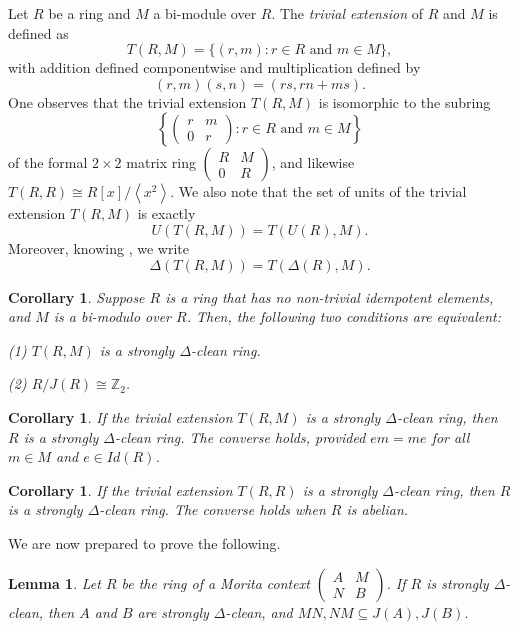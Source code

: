 \documentclass[12pt]{amsart}
\newtheorem{lemma}[theorem]{Lemma}
\newtheorem{corollary}[theorem]{Corollary}
\theoremstyle{definition}
\begin{document}
Let $R$ be a ring and $M$ a bi-module over $R$. The {\it trivial extension} of $R$ and $M$ is defined as
\[ T(R, M) = \{(r, m) : r \in R \text{ and } m \in M\}, \]
with addition defined componentwise and multiplication defined by
\[ (r, m)(s, n) = (rs, rn + ms). \]
One observes that the trivial extension $T(R, M)$ is isomorphic to the subring
\[ \left\{ \begin{pmatrix} r & m \\ 0 & r \end{pmatrix} : r \in R \text{ and } m \in M \right\} \]
of the formal $2 \times 2$ matrix ring $\begin{pmatrix} R & M \\ 0 & R \end{pmatrix}$, and likewise $T(R, R) \cong R[x]/\left\langle x^2 \right\rangle$. We also note that the set of units of the trivial extension $T(R, M)$ is exactly \[ U(T(R, M)) = T(U(R), M). \]
Moreover, knowing \cite {kkqt}, we write
\[ \Delta(T(R, M)) = T(\Delta(R), M). \]

\begin{corollary}
Suppose $R$ is a ring that has no non-trivial idempotent elements, and $M$ is a bi-modulo over $R$. Then, the following two conditions are equivalent:

(1) $T(R, M)$ is a strongly $\Delta$-clean ring.

(2) \( R/J(R) \cong \mathbb{Z}_2 \).
\end{corollary}

\begin{corollary}
If the trivial extension $T(R,M)$ is a strongly $\Delta$-clean ring, then $R$ is a strongly $\Delta$-clean ring. The converse holds, provided $em=me$ for all $m\in M$ and $e\in Id(R)$.
\end{corollary}

\begin{corollary}
If the trivial extension $T(R,R)$ is a strongly $\Delta$-clean ring, then $R$ is a strongly $\Delta$-clean ring. The converse holds when $R$ is abelian.
\end{corollary}

We are now prepared to prove the following.

\begin{lemma}\label{pur mori}
Let $R$ be the ring of a Morita context $\begin{pmatrix}
A & M\\
N & B
\end{pmatrix}$.
If $R$ is strongly $\Delta$-clean, then $A$ and $B$ are strongly $\Delta$-clean, and $MN,NM \subseteq J(A),J(B)$.
\end{lemma}
\end{document}
